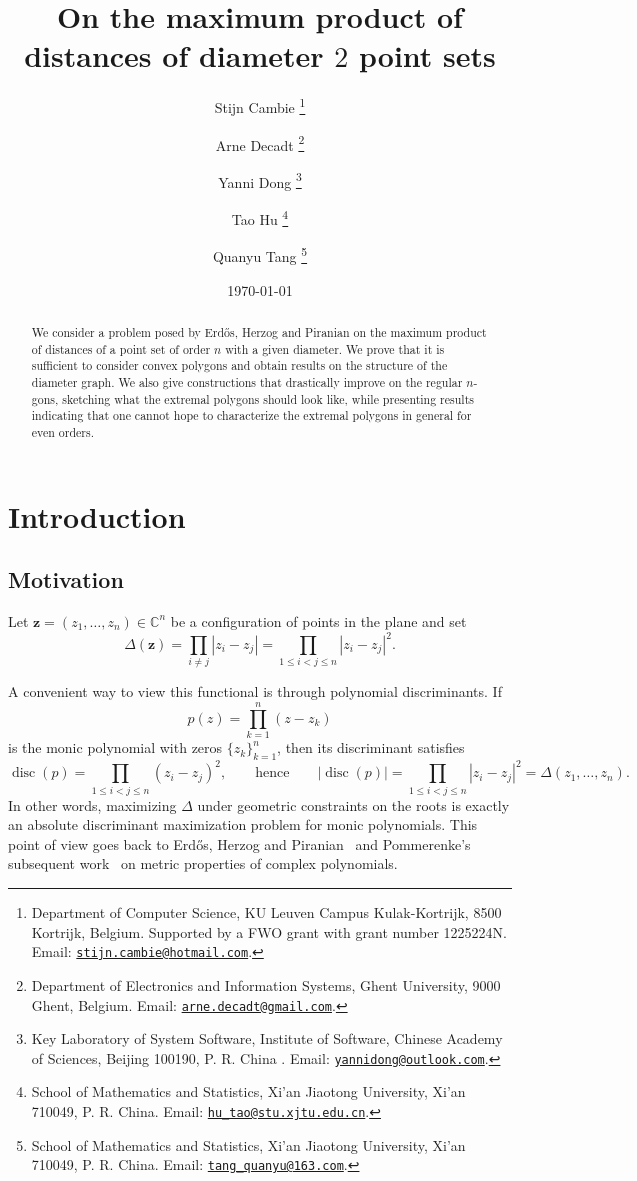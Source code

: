 \documentclass{article}
\title{On the maximum product of distances of diameter $2$ point sets}
\author{
	Stijn Cambie
 \thanks{Department of Computer Science, KU Leuven Campus Kulak-Kortrijk, 8500 Kortrijk, Belgium. 
 Supported by a FWO grant with grant number 1225224N. Email: \protect\href{mailto:stijn.cambie@hotmail.com}{\protect\nolinkurl{stijn.cambie@hotmail.com}}.}	
	\and Arne Decadt
 \thanks{Department of Electronics and Information Systems, Ghent University, 9000 Ghent, Belgium. Email: \protect\href{mailto:arne.decadt@gmail.com}{\protect\nolinkurl{arne.decadt@gmail.com}}.}	
    \and Yanni Dong
 \thanks{Key Laboratory of System Software, Institute of Software, Chinese Academy of Sciences, Beijing 100190,  P. R. China . Email: \protect\href{mailto:yannidong@outlook.com}{\protect\nolinkurl{yannidong@outlook.com}}.}	
    \and Tao Hu
    \thanks{School of Mathematics and Statistics, Xi'an Jiaotong University, Xi'an 710049, P. R. China. Email: \protect\href{mailto:hu_tao@stu.xjtu.edu.cn}{\protect\nolinkurl{hu_tao@stu.xjtu.edu.cn}}.}
\and Quanyu Tang
 \thanks{School of Mathematics and Statistics, Xi'an Jiaotong University, Xi'an 710049, P. R. China. Email: \protect\href{mailto:tang_quanyu@163.com}{\protect\nolinkurl{tang_quanyu@163.com}}.}
 }
\date{\today}
\DeclareMathOperator{\disc}{disc}
\theoremstyle{definition}
\newcommand{\C}{\mathbb{C}}
\let\le\leqslant
\newcounter{col}
\begin{document}
\lstset{basicstyle=\ttfamily,breaklines=true,columns=flexible}

\maketitle

\begin{abstract}
    We consider a problem posed by Erd\H{o}s, Herzog and Piranian on the maximum product of distances of a point set of order $n$ with a given diameter. We prove that it is sufficient to consider convex polygons and obtain results on the structure of the diameter graph.
    We also give constructions that drastically improve on the regular $n$-gons, sketching what the extremal polygons should look like, while presenting results indicating that one cannot hope to characterize the extremal polygons in general for even orders.
\end{abstract}


\section{Introduction}

\subsection{Motivation}
Let $\mathbf{z}=(z_1,\dots,z_n)\in\C^n$ be a configuration of points in the plane and set
\[
\Delta(\mathbf{z})
= \prod_{i\neq j}|z_i-z_j|
= \prod_{1\le i<j\le n}|z_i-z_j|^2.
\]


A convenient way to view this functional is through polynomial discriminants. If
\[
p(z)=\prod_{k=1}^n (z-z_k)
\]
is the monic polynomial with zeros $\{z_k\}_{k=1}^n$, then its discriminant satisfies
\[
\disc(p)=\prod_{1\le i<j\le n}(z_i-z_j)^2,
\qquad\text{hence}\qquad
|\disc(p)|=\prod_{1\le i<j\le n}|z_i-z_j|^2=\Delta(z_1,\dots,z_n).
\]
In other words, maximizing $\Delta$ under geometric constraints on the roots is exactly an
absolute discriminant maximization problem for monic polynomials. This point of view goes
back to Erd\H{o}s, Herzog and Piranian~\cite{ErdosHerzogPiranian1958} and Pommerenke's subsequent work~\cite{Pommerenke1961} on metric properties of complex polynomials.
\end{document}
